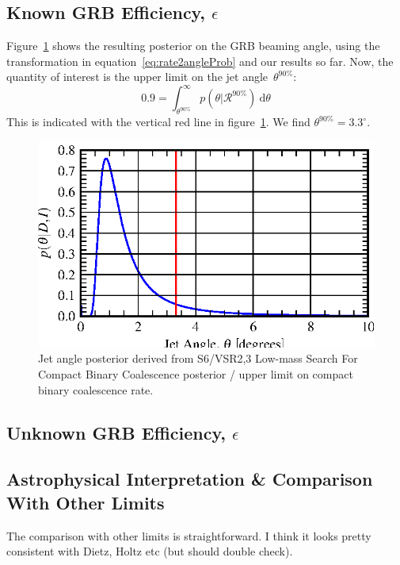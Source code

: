 \documentclass[twocolumn,nofootinbib]{revtex4}
\newcommand{\cbcrate}{{{\mathcal R}}}
\newcommand{\diff}{{\mathrm d}}
\begin{document}
\subsection{Known GRB Efficiency, $\epsilon$}

Figure~\ref{fig:jetPosterior} shows the resulting posterior on the GRB
beaming angle, using the transformation in equation~\ref{eq:rate2angleProb} and
our results so far.  
%
Now, the quantity of interest is the upper limit on the jet
angle~$\theta^{90\%}$:
%
\begin{equation}
0.9 = \int_{\theta^{90\%}}^{\infty}p(\theta | \cbcrate^{90\%})~\diff \theta
\end{equation}
%
This is indicated with the vertical red line in figure~\ref{fig:jetPosterior}.
We find $\theta^{90\%}=3.3^{\circ}$.


\begin{figure}
\includegraphics{jet_angle_posterior_s6UL.eps}
\caption{Jet angle posterior derived from S6/VSR2,3 Low-mass Search For Compact Binary
Coalescence posterior / upper limit on compact binary coalescence
rate.\label{fig:jetPosterior}}
\end{figure}


\subsection{Unknown GRB Efficiency, $\epsilon$}


\subsection{Astrophysical Interpretation \& Comparison With Other Limits}
The comparison with other limits is straightforward.  I think it looks pretty
consistent with Dietz, Holtz etc (but should double check).
\end{document}
